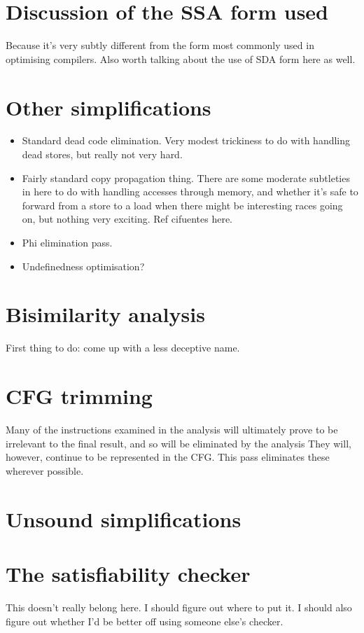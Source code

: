 \section{Discussion of the SSA form used}
Because it's very subtly different from the form most commonly used in optimising compilers.
Also worth talking about the use of SDA form here as well.

\section{Other simplifications}

\begin{itemize}
\item
  Standard dead code elimination.  Very modest trickiness to do with
  handling dead stores, but really not very hard.
\item
  Fairly standard copy propagation thing.  There are some moderate
  subtleties in here to do with handling accesses through memory, and
  whether it's safe to forward from a store to a load when there might
  be interesting races going on, but nothing very exciting.  Ref
  cifuentes here.
\item
  Phi elimination pass.
\item
  Undefinedness optimisation?
\end{itemize}

\section{Bisimilarity analysis}
First thing to do: come up with a less deceptive name.

\section{CFG trimming}

Many of the instructions examined in the analysis will ultimately prove to be irrelevant to the final result, and so will be eliminated by the analysis
They will, however, continue to be represented in the \StateMachine CFG.
This pass eliminates these wherever possible.


\section{Unsound simplifications}

\section{The satisfiability checker}
This doesn't really belong here.  I should figure out where to put it.  I should also figure out whether I'd be better off using someone else's checker.

